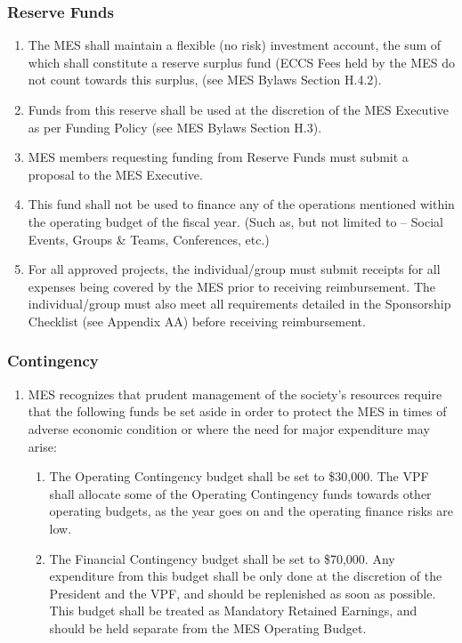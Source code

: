 \hypertarget{reserve-funds}{%
 \subsubsection{Reserve Funds}
 \label{reserve-funds}}
\begin{enumerate}
 \item
  The MES shall maintain a flexible (no risk) investment account, the
  sum of which shall constitute a reserve surplus fund (ECCS Fees held
  by the MES do not count towards this surplus, (see MES Bylaws Section
  H.4.2).
 \item
  Funds from this reserve shall be used at the discretion of the MES
  Executive as per Funding Policy (see MES Bylaws Section H.3).
 \item
  MES members requesting funding from Reserve Funds must submit a
  proposal to the MES Executive.
 \item
  This fund shall not be used to finance any of the operations mentioned
  within the operating budget of the fiscal year. (Such as, but not
  limited to -- Social Events, Groups \& Teams, Conferences, etc.)
 \item
  For all approved projects, the individual/group must submit receipts
  for all expenses being covered by the MES prior to receiving
  reimbursement. The individual/group must also meet all requirements
  detailed in the Sponsorship Checklist (see Appendix AA) before
  receiving reimbursement.

\end{enumerate}

\hypertarget{contingency}{%
 \subsubsection{Contingency}
 \label{contingency}}
\begin{enumerate}
 \item
  MES recognizes that prudent management of the society's resources
  require that the following funds be set aside in order to protect the
  MES in times of adverse economic condition or where the need for major
  expenditure may arise:

  \begin{enumerate}
   \item
    The Operating Contingency budget shall be set to \$30,000. The VPF
    shall allocate some of the Operating Contingency funds towards other
    operating budgets, as the year goes on and the operating finance
    risks are low.
   \item
    The Financial Contingency budget shall be set to \$70,000. Any
    expenditure from this budget shall be only done at the discretion of
    the President and the VPF, and should be replenished as soon as
    possible. This budget shall be treated as Mandatory Retained
    Earnings, and should be held separate from the MES Operating Budget.

  \end{enumerate}
\end{enumerate}

